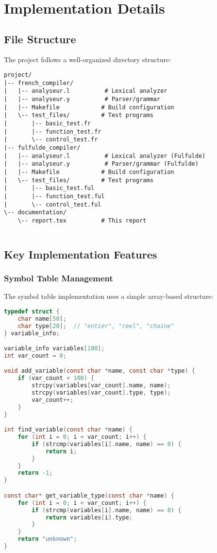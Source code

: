 \documentclass[12pt,a4paper]{article}
\begin{document}
\section{Implementation Details}

\subsection{File Structure}

The project follows a well-organized directory structure:

\begin{lstlisting}[caption={Project Directory Structure}]
project/
|-- french_compiler/
|   |-- analyseur.l          # Lexical analyzer
|   |-- analyseur.y          # Parser/grammar
|   |-- Makefile            # Build configuration
|   \-- test_files/         # Test programs
|       |-- basic_test.fr
|       |-- function_test.fr
|       \-- control_test.fr
|-- fulfulde_compiler/
|   |-- analyseur.l          # Lexical analyzer (Fulfulde)
|   |-- analyseur.y          # Parser/grammar (Fulfulde)
|   |-- Makefile            # Build configuration
|   \-- test_files/         # Test programs
|       |-- basic_test.ful
|       |-- function_test.ful
|       \-- control_test.ful
\-- documentation/
    \-- report.tex          # This report
    

\end{lstlisting}

\subsection{Key Implementation Features}

\subsubsection{Symbol Table Management}

The symbol table implementation uses a simple array-based structure:

\begin{lstlisting}[language=C, caption={Symbol Table Structure}]
typedef struct {
    char name[50];
    char type[20];  // "entier", "reel", "chaine"
} variable_info;

variable_info variables[100];
int var_count = 0;

void add_variable(const char *name, const char *type) {
    if (var_count < 100) {
        strcpy(variables[var_count].name, name);
        strcpy(variables[var_count].type, type);
        var_count++;
    }
}

int find_variable(const char *name) {
    for (int i = 0; i < var_count; i++) {
        if (strcmp(variables[i].name, name) == 0) {
            return i;
        }
    }
    return -1;
}

const char* get_variable_type(const char *name) {
    for (int i = 0; i < var_count; i++) {
        if (strcmp(variables[i].name, name) == 0) {
            return variables[i].type;
        }
    }
    return "unknown";
}
\end{lstlisting}
\end{document}

